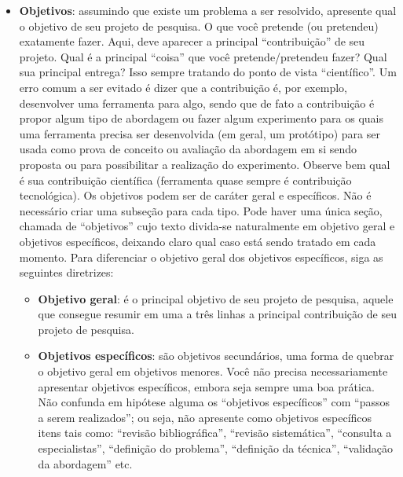 \documentclass[
	12pt,				%
	oneside,			%
	a4paper,			%
	english,			%
	brazil				%
	]{abntex2ppgsi}
\begin{document}
\begin{itemize}
	\item \textbf{Objetivos}: assumindo que existe um problema a ser resolvido, apresente qual o objetivo de seu projeto de pesquisa. O que você pretende (ou pretendeu) exatamente fazer. Aqui, deve aparecer a principal ``contribuição'' de seu projeto. Qual é a principal ``coisa'' que você pretende/pretendeu fazer? Qual sua principal entrega? Isso sempre tratando do ponto de vista ``científico''. Um erro comum a ser evitado é dizer que a contribuição é, por exemplo, desenvolver uma ferramenta para algo, sendo que de fato a contribuição é propor algum tipo de abordagem ou fazer algum experimento para os quais uma ferramenta precisa ser desenvolvida (em geral, um protótipo) para ser usada como prova de conceito ou avaliação da abordagem em si sendo proposta ou para possibilitar a realização do experimento. Observe bem qual é sua contribuição científica (ferramenta quase sempre é contribuição tecnológica). Os objetivos podem ser de caráter geral e específicos. Não é necessário criar uma subseção para cada tipo. Pode haver uma única seção, chamada de ``objetivos'' cujo texto divida-se naturalmente em objetivo geral e objetivos específicos, deixando claro qual caso está sendo tratado em cada momento. Para diferenciar o objetivo geral dos objetivos específicos, siga as seguintes diretrizes:
	\begin{itemize}
		\item \textbf{Objetivo geral}: é o principal objetivo de seu projeto de pesquisa, aquele que consegue resumir em uma a três linhas a principal contribuição de seu projeto de pesquisa. 
		\item \textbf{Objetivos específicos}: são objetivos secundários, uma forma de quebrar o objetivo geral em objetivos menores. Você não precisa necessariamente apresentar objetivos específicos, embora seja sempre uma boa prática. Não confunda em hipótese alguma os ``objetivos específicos'' com ``passos a serem realizados''; ou seja, não apresente como objetivos específicos itens tais como: ``revisão bibliográfica'', ``revisão sistemática'', ``consulta a especialistas'', ``definição do problema'', ``definição da técnica'', ``validação da abordagem'' etc.
	\end{itemize}

\end{itemize}
\end{document}
